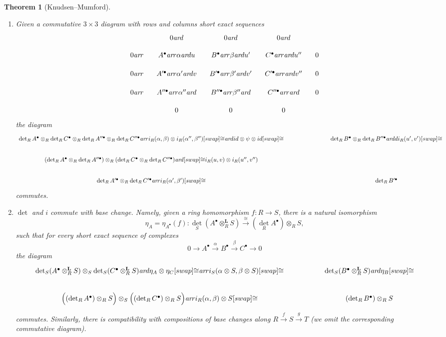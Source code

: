 \documentclass[10pt,a4paper,oneside,draft]{article}
\renewcommand{\det}{\operatorname{det}}
\newcommand{\ar}{\text{\it ar}}
\theoremstyle{myplain}
\newtheorem{theorem}{Theorem}[section]
\theoremstyle{mydefinition}
\numberwithin{equation}{section}
\begin{document}
\begin{appendices}
\begin{theorem}[Knudsen--Mumford]
\begin{enumerate}
  \item[ii)] Given a commutative $3\times 3$ diagram with rows and columns short
    exact sequences
    \[ \begin{tikzcd}[row sep=1em, column sep=1em]
        & 0\ar{d} & 0\ar{d} & 0\ar{d} \\
        0\ar{r} & A^\bullet\ar{r}{\alpha}\ar{d}{u} & B^\bullet\ar{r}{\beta}\ar{d}{u'} & C^\bullet\ar{r}\ar{d}{u''} & 0 \\
        0\ar{r} & A'^\bullet\ar{r}{\alpha'}\ar{d}{v} & B'^\bullet\ar{r}{\beta'}\ar{d}{v'} & C'^\bullet\ar{r}\ar{d}{v''} & 0 \\
        0\ar{r} & A''^\bullet\ar{r}{\alpha''}\ar{d} & B''^\bullet\ar{r}{\beta''}\ar{d} & C''^\bullet\ar{r}\ar{d} & 0 \\
        & 0 & 0 & 0
      \end{tikzcd} \]
    the diagram
    \[ \begin{tikzcd}[column sep=7em]
        \det_R A^\bullet \otimes_R \det_R C^\bullet \otimes_R \det_R A''^\bullet \otimes_R \det_R C''^\bullet \ar{r}{i_R (\alpha,\beta) \otimes i_R (\alpha'',\beta'')}[swap]{\cong}\ar{d}{id \otimes \psi \otimes id}[swap]{\cong} & \det_R B^\bullet \otimes_R \det_R B''^\bullet\ar{dd}{i_R (u',v')}[swap]{\cong} \\
        (\det_R A^\bullet \otimes_R \det_R A''^\bullet) \otimes_R (\det_R C^\bullet \otimes_R \det_R C''^\bullet)\ar{d}[swap]{\cong}{i_R (u,v) \otimes i_R (u'',v'')} \\
        \det_R A'^\bullet \otimes_R \det_R C'^\bullet \ar{r}{i_R (\alpha',\beta')}[swap]{\cong} & \det_R B'^\bullet
      \end{tikzcd} \]
    commutes.

  \item[iii)] $\det$ and $i$ commute with base change. Namely, given a ring
    homomorphism $f\colon R\to S$, there is a natural isomorphism
    \[ \eta_A = \eta_{A^\bullet} (f)\colon
      \det_S (A^\bullet \otimes_R^\mathbf{L} S) \xrightarrow{\cong}
      (\det_R A^\bullet) \otimes_R S, \]
    such that for every short exact sequence of complexes
    \[ 0 \to A^\bullet \xrightarrow{\alpha} B^\bullet \xrightarrow{\beta}
      C^\bullet \to 0 \]
    the diagram
    \[ \begin{tikzcd}[column sep=5em]
        \det_S (A^\bullet \otimes_R^\mathbf{L} S) \otimes_S \det_S (C^\bullet \otimes_R^\mathbf{L} S) \ar{d}{\eta_A \otimes \eta_C}[swap]{\cong}\ar{r}{i_S (\alpha\otimes S, \beta\otimes S)}[swap]{\cong} & \det_S (B^\bullet \otimes_R^\mathbf{L} S) \ar{d}{\eta_B}[swap]{\cong} \\
        \Bigl((\det_R A^\bullet) \otimes_R S\Bigr) \otimes_S \Bigl((\det_R C^\bullet) \otimes_R S\Bigr) \ar{r}{i_R (\alpha,\beta) \otimes S}[swap]{\cong} & (\det_R B^\bullet) \otimes_R S
      \end{tikzcd} \]
    commutes. Similarly, there is compatibility with compositions of base
    changes along $R \xrightarrow{f} S \xrightarrow{g} T$ (we omit the
    corresponding commutative diagram).
  \end{enumerate}
\end{theorem}


\end{appendices}
\end{document}
